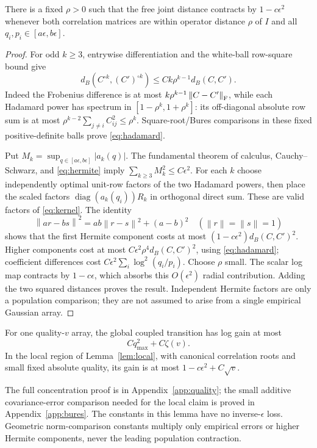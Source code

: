 \documentclass[11pt]{article}
\newcommand{\diag}{\operatorname{diag}}\newcommand{\sech}{\operatorname{sech}}
\newcommand{\norm}[1]{\left\lVert#1\right\rVert}
\newcommand{\Had}{\mathbin{\circ}}\newcommand{\one}{\mathbf1}
\begin{document}
\begin{lemma}\label{lem:local}
There is a fixed $\rho>0$ such that the free joint distance contracts by $1-c\epsilon^2$ whenever both correlation matrices are within operator distance $\rho$ of $I$ and all $q_i,p_i\in[a\epsilon,b\epsilon]$.
\end{lemma}
\begin{proof}
For odd $k\ge3$, entrywise differentiation and the white-ball row-square bound give
\begin{equation}\label{eq:hadamard}
 d_B(C^{\Had k},(C')^{\Had k})\le Ck\rho^{k-1}d_B(C,C').
\end{equation}
Indeed the Frobenius difference is at most $k\rho^{k-1}\norm{C-C'}_\F$, while each Hadamard power has spectrum in $[1-\rho^k,1+\rho^k]$: its off-diagonal absolute row sum is at most $\rho^{k-2}\sum_{j\ne i}C_{ij}^2\le\rho^k$. Square-root/Bures comparisons in these fixed positive-definite balls prove \eqref{eq:hadamard}.

Put $M_k=\sup_{q\in[a\epsilon,b\epsilon]}|a_k(q)|$. The fundamental theorem of calculus, Cauchy--Schwarz, and \eqref{eq:hermite} imply $\sum_{k\ge3}M_k^2\le C\epsilon^2$. For each $k$ choose independently optimal unit-row factors of the two Hadamard powers, then place the scaled factors $\diag(a_k(q_i))R_k$ in orthogonal direct sum. These are valid factors of \eqref{eq:kernel}. The identity
\[
 \norm{ar-bs}^2=ab\norm{r-s}^2+(a-b)^2\quad(\norm r=\norm s=1)
\]
shows that the first Hermite component costs at most $(1-c\epsilon^2)d_B(C,C')^2$. Higher components cost at most $C\epsilon^2\rho^4d_B(C,C')^2$, using \eqref{eq:hadamard}; coefficient differences cost $C\epsilon^2\sum_i\log^2(q_i/p_i)$. Choose $\rho$ small. The scalar log map contracts by $1-c\epsilon$, which absorbs this $O(\epsilon^2)$ radial contribution. Adding the two squared distances proves the result. Independent Hermite factors are only a population comparison; they are not assumed to arise from a single empirical Gaussian array.
\end{proof}

\begin{lemma}\label{lem:empmetric}
For one quality-$v$ array, the global coupled transition has log gain at most
\begin{equation}\label{eq:globalemp}
 Cq_{\max}^2+C\zeta(v).
\end{equation}
In the local region of Lemma~\ref{lem:local}, with canonical correlation roots and small fixed absolute quality, its gain is at most $1-c\epsilon^2+C\sqrt v$.
\end{lemma}
The full concentration proof is in Appendix~\ref{app:quality}; the small additive covariance-error comparison needed for the local claim is proved in Appendix~\ref{app:bures}. The constants in this lemma have no inverse-$\epsilon$ loss. Geometric norm-comparison constants multiply only empirical errors or higher Hermite components, never the leading population contraction.
\end{document}

